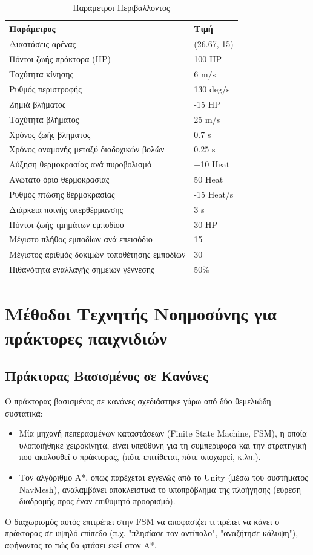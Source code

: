 \documentclass[12pt]{article}
\begin{document}
\begin{table}[H]
\centering
\caption{Παράμετροι Περιβάλλοντος}
\label{tab:env-params}
\begin{tabular}{ll}
\hline
\textbf{Παράμετρος} & \textbf{Τιμή} \\
\hline
Διαστάσεις αρένας & (26.67, 15) \\
Πόντοι ζωής πράκτορα (HP) & 100 HP \\
Ταχύτητα κίνησης & 6 m/s \\
Ρυθμός περιστροφής & 130 deg/s \\
Ζημιά βλήματος & -15 HP \\
Ταχύτητα βλήματος & 25 m/s \\
Χρόνος ζωής βλήματος & 0.7 s \\
Χρόνος αναμονής μεταξύ διαδοχικών βολών & 0.25 s \\
Αύξηση θερμοκρασίας ανά πυροβολισμό & +10 Heat \\
Ανώτατο όριο θερμοκρασίας & 50 Heat \\
Ρυθμός πτώσης θερμοκρασίας & -15 Heat/s \\
Διάρκεια ποινής υπερθέρμανσης & 3 s \\
Πόντοι ζωής τμημάτων εμποδίου & 30 HP \\
Μέγιστο πλήθος εμποδίων ανά επεισόδιο & 15 \\
Μέγιστος αριθμός δοκιμών τοποθέτησης εμποδίων & 30 \\
Πιθανότητα εναλλαγής σημείων γέννεσης & 50\% \\
\hline
\end{tabular}
\end{table}

\section{Μέθοδοι Τεχνητής Νοημοσύνης για πράκτορες παιχνιδιών}
\subsection{Πράκτορας Βασισμένος σε Κανόνες}
Ο πράκτορας βασισμένος σε κανόνες σχεδιάστηκε γύρω από δύο θεμελιώδη συστατικά:
\begin{itemize}
    \item Μία μηχανή πεπερασμένων καταστάσεων (Finite State Machine, FSM), η οποία υλοποιήθηκε χειροκίνητα, είναι υπεύθυνη για τη συμπεριφορά και την στρατηγική που ακολουθεί ο πράκτορας, (πότε επιτίθεται, πότε υποχωρεί, κ.λπ.).
    \item Τον αλγόριθμο A*, όπως παρέχεται εγγενώς από το Unity (μέσω του συστήματος NavMesh), αναλαμβάνει αποκλειστικά το υποπρόβλημα της πλοήγησης (εύρεση διαδρομής προς έναν επιθυμητό προορισμό). 
\end{itemize}
Ο διαχωρισμός αυτός επιτρέπει στην FSM να αποφασίζει τι πρέπει να κάνει ο πράκτορας σε υψηλό επίπεδο (π.χ. "πλησίασε τον αντίπαλο", "αναζήτησε κάλυψη"), αφήνοντας το πώς θα φτάσει εκεί στον A*.
\end{document}
